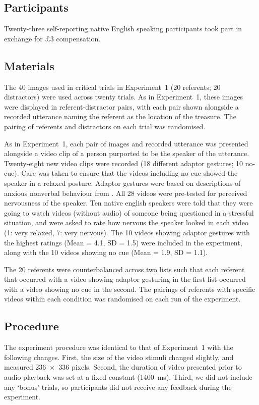 \documentclass[a4paper,man,natbib]{apa6}
\begin{document}
\subsection{Participants}
Twenty-three self-reporting native English speaking participants took part in exchange for \pounds{}3 compensation.


\subsection{Materials}
The 40 images used in critical trials in Experiment~1 (20 referents; 20 distractors) were used across twenty trials.
As in Experiment~1, these images were displayed in referent-distractor pairs, with each pair shown alongside a recorded utterance naming the referent as the location of the treasure.
The pairing of referents and distractors on each trial was randomised.

As in Experiment~1, each pair of images and recorded utterance was presented alongside a video clip of a person purported to be the speaker of the utterance.
Twenty-eight new video clips were recorded (18 different adaptor gestures; 10 no-cue). 
Care was taken to ensure that the videos including no cue showed the speaker in a relaxed posture. 
Adaptor gestures were based on descriptions of anxious nonverbal behaviour from \citet{Gregersen2005}.
All 28 videos were pre-tested for perceived nervousness of the speaker.
Ten native english speakers were told that they were going to watch videos (without audio) of someone being questioned in a stressful situation, and were asked to rate how nervous the speaker looked in each video (1: very relaxed, 7: very nervous). 
The 10 videos showing adaptor gestures with the highest ratings (Mean = 4.1, SD = 1.5) were included in the experiment, along with the 10 videos showing no cue (Mean = 1.9, SD = 1.1).

The 20 referents were counterbalanced across two lists such that each referent that occurred with a video showing adaptor gesturing in the first list occurred with a video showing no cue in the second.
The pairings of referents with specific videos within each condition was randomised on each run of the experiment.

\subsection{Procedure}
The experiment procedure was identical to that of Experiment~1 with the following changes.
First, the size of the video stimuli changed slightly, and measured 236~$\times$~336 pixels.
Second, the duration of video presented prior to audio playback was set at a fixed constant (1400~ms).
Third, we did not include any `bonus' trials, so participants did not receive any feedback during the experiment.
\end{document}

